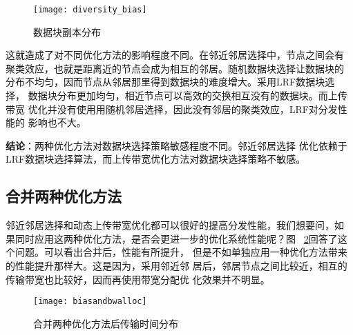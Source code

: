 \begin{figure}[htbp]
  \centering
  \begin{minipage}{0.6\linewidth}
    \centering
    \texttt{[image: diversity\_bias]}
    \caption{数据块副本分布}
    \label{fig:diversity_bias}
  \end{minipage}
\end{figure}


这就造成了对不同优化方法的影响程度不同。在邻近邻居选择中，节点之间会有
聚类效应，也就是距离近的节点会成为相互的邻居。随机数据块选择让数据块的
分布不均匀，因而节点从邻居那里得到数据块的难度增大。采用LRF数据块选择，
数据块分布更加均匀，相近节点可以高效的交换相互没有的数据块。而上传带宽
优化并没有使用用随机邻居选择，因此没有邻居的聚类效应，LRF对分发性能的
影响也不大。


\textbf{结论}：两种优化方法对数据块选择策略敏感程度不同。邻近邻居选择
优化依赖于LRF数据块选择算法，而上传带宽优化方法对数据块选择策略不敏感。


\subsection{合并两种优化方法}

邻近邻居选择和动态上传带宽优化都可以很好的提高分发性能，我们想要问，如
果同时应用这两种优化方法，是否会更进一步的优化系统性能呢？图~
\ref{fig:biasandbwalloc}回答了这个问题。可以看出合并后，性能有所提升，
但是不如单独应用一种优化方法带来的性能提升那样大。这是因为，采用邻近邻
居后，邻居节点之间比较近，相互的传输带宽也比较好，因而再使用带宽分配优
化效果并不明显。

\begin{figure}[htbp]
  \centering
  \begin{minipage}{0.6\linewidth}
    \centering
    \texttt{[image: biasandbwalloc]}
    \caption{合并两种优化方法后传输时间分布}
    \label{fig:biasandbwalloc}
  \end{minipage}
\end{figure}

